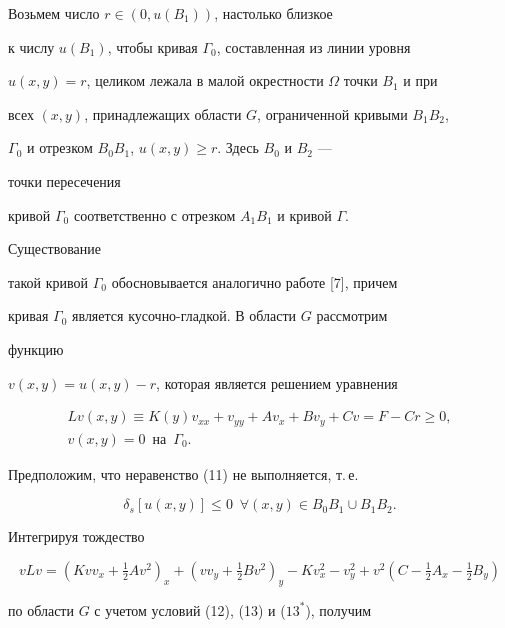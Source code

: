 \begin{pf} 


Возьмем число $r\in(0,u(B_1))$, настолько близкое 


к числу $u(B_1)$, чтобы кривая $\Gamma_0$, составленная из линии уровня 


$u(x,y)=r$, целиком лежала в малой окрестности $\Omega$ точки $B_1$ и при 


всех $(x,y)$, принадлежащих области $G$, ограниченной кривыми $B_1B_2$, 


$\Gamma_0$ и отрезком $B_0B_1$, $u(x,y)\ge r$. Здесь $B_0$ и $B_2$ --- 


точки пересечения 


кривой $\Gamma_0$ соответственно с отрезком $A_1B_1$ и кривой $\Gamma$. 


Существование 


такой кривой $\Gamma_0$ обосновывается аналогично работе [7], причем 


кривая $\Gamma_0$ является кусочно-гладкой. В области $G$ рассмотрим 


функцию 


$v(x,y)=u(x,y)-r$, которая является решением уравнения 


\begin{gather} 


L v(x,y)\equiv K(y)v_{xx}+v_{yy}+A v_x+B v_y+C v=F-C r\ge0,\\ 


% 


v(x,y)=0\ \; \text{на}\ \; \Gamma_0. 


\end{gather} 


Предположим, что неравенство (11) не выполняется, т.\,е. 


\begin{equation} 


\delta_s[u(x,y)]\le0\ \; \forall(x,y)\in B_0B_1\cup B_1B_2. 


\tag{$13^*$} 


\end{equation} 


Интегрируя тождество 


$$ 


v L v=(K v v_x+\tfrac{1}{2}A v^2)_x+(v v_y+\tfrac{1}{2}B v^2)_y- 


K v^2_x-v^2_y+v^2(C-\tfrac{1}{2}A_x-\tfrac{1}{2}B_y) 


$$ 


по области $G$ с учетом условий (12), (13) и ($13^*$), получим 



\end{pf}
